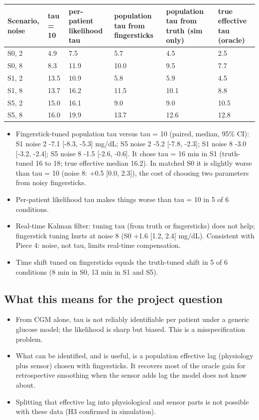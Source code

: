 \documentclass[11pt,a4paper]{article}
\providecommand{\tightlist}{\setlength{\itemsep}{0pt}\setlength{\parskip}{0pt}}
\begin{document}
\begin{longtable}[]{@{}llllll@{}}
\toprule\noalign{}
Scenario, noise & tau = 10 & per-patient likelihood tau & population tau
from fingersticks & population tau from truth (sim only) & true
effective tau (oracle) \\
\midrule\noalign{}
\endhead
\bottomrule\noalign{}
\endlastfoot
S0, 2 & 4.9 & 7.5 & 5.7 & 4.5 & 2.5 \\
S0, 8 & 8.3 & 11.9 & 10.0 & 9.5 & 7.7 \\
S1, 2 & 13.5 & 10.9 & 5.8 & 5.9 & 4.5 \\
S1, 8 & 13.7 & 16.2 & 11.5 & 10.1 & 8.8 \\
S5, 2 & 15.0 & 16.1 & 9.0 & 9.0 & 10.5 \\
S5, 8 & 16.0 & 19.9 & 13.7 & 12.6 & 12.8 \\
\end{longtable}

\begin{itemize}
\tightlist
\item
  Fingerstick-tuned population tau versus tau = 10 (paired, median, 95\%
  CI): S1 noise 2 -7.1 {[}-8.3, -5.3{]} mg/dL; S5 noise 2 -5.2 {[}-7.8,
  -2.3{]}; S1 noise 8 -3.0 {[}-3.2, -2.4{]}; S5 noise 8 -1.5 {[}-2.6,
  -0.6{]}. It chose tau = 16 min in S1 (truth-tuned 16 to 18; true
  effective median 16.2). In matched S0 it is slightly worse than tau =
  10 (noise 8: +0.5 {[}0.0, 2.3{]}), the cost of choosing two parameters
  from noisy fingersticks.
\item
  Per-patient likelihood tau makes things worse than tau = 10 in 5 of 6
  conditions.
\item
  Real-time Kalman filter: tuning tau (from truth or fingersticks) does
  not help; fingerstick tuning hurts at noise 8 (S0 +1.6 {[}1.2, 2.4{]}
  mg/dL). Consistent with Piece 4: noise, not tau, limits real-time
  compensation.
\item
  Time shift tuned on fingersticks equals the truth-tuned shift in 5 of
  6 conditions (8 min in S0, 13 min in S1 and S5).
\end{itemize}

\hypertarget{what-this-means-for-the-project-question}{%
\subsection{What this means for the project
question}\label{what-this-means-for-the-project-question}}

\begin{itemize}
\tightlist
\item
  From CGM alone, tau is not reliably identifiable per patient under a
  generic glucose model; the likelihood is sharp but biased. This is a
  misspecification problem.
\item
  What can be identified, and is useful, is a population effective lag
  (physiology plus sensor) chosen with fingersticks. It recovers most of
  the oracle gain for retrospective smoothing when the sensor adds lag
  the model does not know about.
\item
  Splitting that effective lag into physiological and sensor parts is
  not possible with these data (H3 confirmed in simulation).
\end{itemize}
\end{document}
